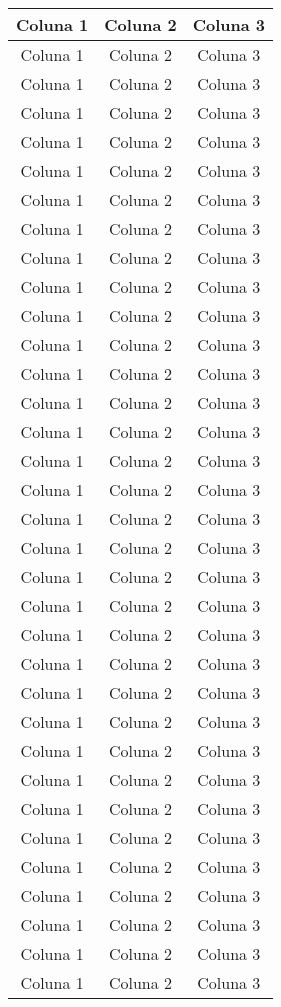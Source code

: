 \documentclass[a4paper,12pt]{article}
\begin{document}
\begin{longtable}[c]{ccc}
		Coluna 1 & Coluna 2 & Coluna 3 \\
		\midrule
		Coluna 1 & Coluna 2 & Coluna 3 \\
		Coluna 1 & Coluna 2 & Coluna 3 \\
		Coluna 1 & Coluna 2 & Coluna 3 \\
		Coluna 1 & Coluna 2 & Coluna 3 \\
		Coluna 1 & Coluna 2 & Coluna 3 \\
		\midrule
		Coluna 1 & Coluna 2 & Coluna 3 \\
		Coluna 1 & Coluna 2 & Coluna 3 \\
		Coluna 1 & Coluna 2 & Coluna 3 \\
		Coluna 1 & Coluna 2 & Coluna 3 \\
		Coluna 1 & Coluna 2 & Coluna 3 \\
		\midrule
		Coluna 1 & Coluna 2 & Coluna 3 \\
		Coluna 1 & Coluna 2 & Coluna 3 \\
		Coluna 1 & Coluna 2 & Coluna 3 \\
		Coluna 1 & Coluna 2 & Coluna 3 \\
		Coluna 1 & Coluna 2 & Coluna 3 \\
		\midrule
		Coluna 1 & Coluna 2 & Coluna 3 \\
		Coluna 1 & Coluna 2 & Coluna 3 \\
		Coluna 1 & Coluna 2 & Coluna 3 \\
		Coluna 1 & Coluna 2 & Coluna 3 \\
		Coluna 1 & Coluna 2 & Coluna 3 \\
		\midrule
		Coluna 1 & Coluna 2 & Coluna 3 \\
		Coluna 1 & Coluna 2 & Coluna 3 \\
		Coluna 1 & Coluna 2 & Coluna 3 \\
		Coluna 1 & Coluna 2 & Coluna 3 \\
		Coluna 1 & Coluna 2 & Coluna 3 \\
		\midrule
		Coluna 1 & Coluna 2 & Coluna 3 \\
		Coluna 1 & Coluna 2 & Coluna 3 \\
		Coluna 1 & Coluna 2 & Coluna 3 \\
		Coluna 1 & Coluna 2 & Coluna 3 \\
		Coluna 1 & Coluna 2 & Coluna 3 \\
		\midrule
		Coluna 1 & Coluna 2 & Coluna 3 \\
		Coluna 1 & Coluna 2 & Coluna 3 \\
		Coluna 1 & Coluna 2 & Coluna 3 \\

\end{longtable}
\end{document}
